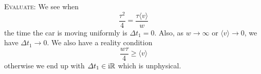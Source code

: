 \begin{soln}
\textsc{Evaluate:}
We see when
\begin{equation}
\frac{\tau^{2}}{4}=\frac{\tau\langle v\rangle}{w}
\end{equation}
the time the car is moving uniformly is $\Delta t_{1}=0$.
Also, as $w\to\infty$ or $\langle v\rangle\to0$, we have $\Delta t_{1}\to 0$. We also have a reality condition
\begin{equation}
\frac{w\tau}{4}\geq\langle v\rangle
\end{equation}
otherwise we end up with $\varDelta t_{1}\in\mathrm{i}\mathbb{R}$ which is unphysical.
\end{soln}